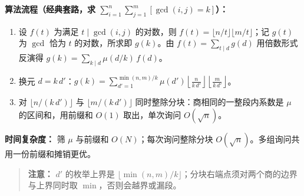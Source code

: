 \textbf{算法流程（经典套路，求 $\sum_{i=1}^{n}\sum_{j=1}^{m}[\gcd(i,j)=k]$）：}
\begin{enumerate}
    \item 设 $f(t)$ 为满足 $t\mid\gcd(i,j)$ 的对数，则 $f(t)=\lfloor n/t\rfloor\lfloor m/t\rfloor$；记 $g(t)$ 为 $\gcd$ 恰为 $t$ 的对数，所求即 $g(k)$。由 $f(t)=\sum_{t\mid d}g(d)$ 用倍数形式反演得 $g(k)=\sum_{k\mid d}\mu(d/k)\,f(d)$。
    \item 换元 $d=k\,d'$：$g(k)=\sum_{d'=1}^{\min(n,m)/k}\mu(d')\left\lfloor\frac{n}{k\,d'}\right\rfloor\left\lfloor\frac{m}{k\,d'}\right\rfloor$。
    \item 对 $\lfloor n/(k\,d')\rfloor$ 与 $\lfloor m/(k\,d')\rfloor$ 同时整除分块：商相同的一整段内系数是 $\mu$ 的区间和，用前缀和 $O(1)$ 取出，单次询问 $O(\sqrt{n})$。
\end{enumerate}

\textbf{时间复杂度：} 筛 $\mu$ 与前缀和 $O(N)$；每次询问整除分块 $O(\sqrt{n})$。多组询问共用一份前缀和摊销更优。

\begin{quote}
\textbf{注意：} $d'$ 的枚举上界是 $\lfloor\min(n,m)/k\rfloor$；分块右端点须对两个商的边界与上界同时取 $\min$，否则会越界或漏段。
\end{quote}


